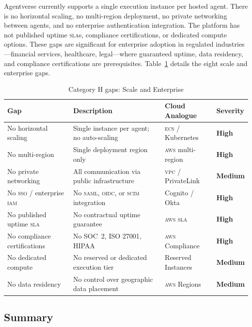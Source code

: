 \documentclass[twoside,11pt]{article}
\newcommand{\high}{\textcolor{red!70!black}{\textbf{High}}}
\newcommand{\medium}{\textcolor{orange!80!black}{\textbf{Medium}}}
\begin{document}
Agentverse currently supports a single execution instance per hosted agent.
There is no horizontal scaling, no multi-region deployment, no private
networking between agents, and no enterprise authentication integration.  The
platform has not published uptime \textsc{sla}s, compliance certifications, or
dedicated compute options.  These gaps are significant for enterprise adoption
in regulated industries---financial services, healthcare, legal---where
guaranteed uptime, data residency, and compliance certifications are
prerequisites.  Table~\ref{tab:gap-enterprise} details the eight scale and
enterprise gaps.

\begin{table}[htbp]
\centering
\caption{Category H gaps: Scale and Enterprise}
\label{tab:gap-enterprise}
\begin{tabular}{p{3.2cm} p{5.5cm} p{2.9cm} l}
\toprule
\textbf{Gap} & \textbf{Description} & \textbf{Cloud Analogue} &
\textbf{Severity} \\
\midrule
No horizontal scaling & Single instance per agent; no auto-scaling &
\textsc{ecs} / Kubernetes & \high \\[4pt]
No multi-region & Single deployment region only & \textsc{aws} multi-region &
\high \\[4pt]
No private networking & All communication via public infrastructure & \textsc{vpc}
/ PrivateLink & \medium \\[4pt]
No \textsc{sso} / enterprise \textsc{iam} & No \textsc{saml}, \textsc{oidc}, or
\textsc{scim} integration & Cognito / Okta & \high \\[4pt]
No published uptime \textsc{sla} & No contractual uptime guarantee & \textsc{aws sla} &
\high \\[4pt]
No compliance certifications & No SOC~2, ISO 27001, HIPAA & \textsc{aws}
Compliance & \high \\[4pt]
No dedicated compute & No reserved or dedicated execution tier & Reserved
Instances & \medium \\[4pt]
No data residency & No control over geographic data placement & \textsc{aws}
Regions & \medium \\
\bottomrule
\end{tabular}
\end{table}

\subsection{Summary}
\label{subsec:gap-summary}
\end{document}
